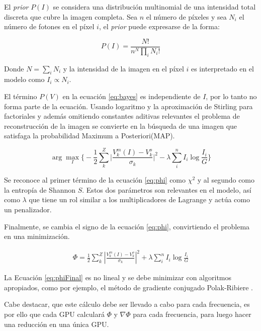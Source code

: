 El \textit{prior} $P(I)$ se considera una distribución multinomial de una intensidad total discreta que cubre la imagen completa. Sea $n$ el número de píxeles y sea $N_{i}$ el número de fotones en el píxel $i$, el \textit{prior} puede expresarse de la forma:

\begin{equation}
P(I) = \frac{N!}{n^N\prod_i{N_i!}} 
\label{eq:imageProb}
\end{equation}

Donde $N=\sum_i N_{i}$ y la intensidad de la imagen en el píxel $i$ es interpretado en el modelo como $I_{i} \propto N_{i}$.

El término $P(V)$ en la ecuación \ref{eq:bayes} es independiente de $I$, por lo tanto no forma parte de la ecuación. Usando logaritmo y la aproximación de Stirling para factoriales y además omitiendo constantes aditivas relevantes el problema de reconstrucción de la imagen se convierte en la búsqueda de una imagen que satisfaga la probabilidad Maximum a Posteriori(MAP).

\begin{equation}
\arg \max_{I} \biggl\{
            -\frac{1}{2} \sum_k^{Z}{ \biggl| \frac{V^m_k(I)-V^o_k}{\sigma_k}  \biggr|^2 }-
            \lambda \sum_i^{n}{I_i \log{\frac{I_i}{G}}}
            \biggr\}
\label{eq:phi}
\end{equation} 

Se reconoce al primer término de la ecuación \ref{eq:phi} como $\chi^{2}$ y al segundo como la entropía de Shannon $S$. Estos dos parámetros son relevantes en el modelo, así como $\lambda$ que tiene un rol similar a los multiplicadores de Lagrange y actúa como un penalizador.

Finalmente, se cambia el signo de la ecuación \ref{eq:phi}, convirtiendo el problema en una minimización.

\begin{align}
\label{eq:phiFinal}
 \Phi = \frac{1}{2}\sum_k^{Z}{{|\frac{V^m_k(I)-V^o_k}{\sigma_k}|^2} + \lambda \sum_i^{n}{I_i \log{\frac{I_i}{G}}}}
\end{align}


La Ecuación \ref{eq:phiFinal} es no lineal y se debe minimizar con algoritmos apropiados, como por ejemplo, el método de gradiente conjugado Polak-Ribiere \cite{polak}.

Cabe destacar, que este cálculo debe ser llevado a cabo para cada frecuencia, es por ello que cada GPU calculará $\Phi$ y $\nabla\Phi$ para cada frecuencia, para luego hacer una reducción en una única GPU.

